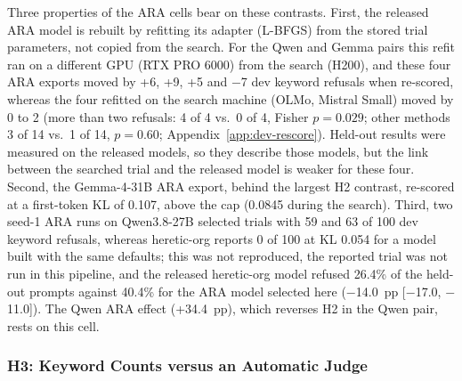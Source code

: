 Three properties of the ARA cells bear on these contrasts. First, the released
ARA model is rebuilt by refitting its adapter (L-BFGS) from the stored trial
parameters, not copied from the search. For the Qwen and Gemma pairs this
refit ran on a different GPU (RTX PRO 6000) from the search (H200), and these
four ARA exports moved by +6, +9, +5 and $-$7 dev keyword refusals when
re-scored, whereas the four refitted on the search machine (OLMo, Mistral
Small) moved by 0 to 2 (more than two refusals: 4 of 4 vs.\ 0 of 4, Fisher
$p=0.029$; other methods 3 of 14 vs.\ 1 of 14, $p=0.60$;
Appendix~\ref{app:dev-rescore}). Held-out results were measured on the
released models, so they describe those models, but the link between the
searched trial and the released model is weaker for these four. Second, the
Gemma-4-31B ARA export, behind the largest H2 contrast, re-scored at a
first-token KL of 0.107, above the cap (0.0845 during the search). Third, two
seed-1 ARA runs on Qwen3.8-27B selected trials with 59 and 63 of 100 dev
keyword refusals, whereas heretic-org reports 0 of 100 at KL 0.054 for a
model built with the same defaults; this was not reproduced, the reported
trial was not run in this pipeline, and the released heretic-org model refused
26.4\% of the held-out prompts against 40.4\% for the ARA model selected here
($-$14.0~pp [$-$17.0, $-$11.0]). The Qwen ARA effect (+34.4~pp), which
reverses H2 in the Qwen pair, rests on this cell.

\subsubsection*{H3: Keyword Counts versus an Automatic Judge}

